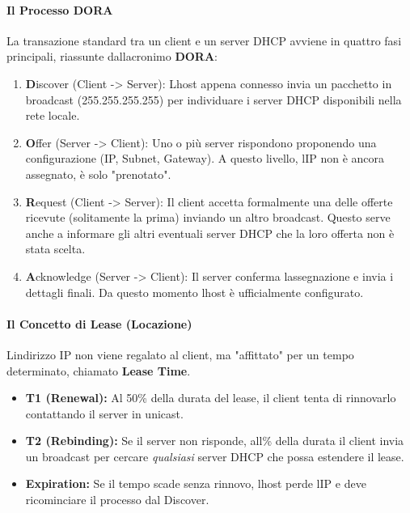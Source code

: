 \documentclass[11pt,a4paper]{article}
\begin{document}
\paragraph{Il Processo DORA}\label{il-processo-dora}

La transazione standard tra un client e un server DHCP avviene in
quattro fasi principali, riassunte dall\textquotesingle acronimo
\textbf{DORA}:

\begin{enumerate}
\def\labelenumi{\arabic{enumi}.}
\item
  \textbf{D}iscover (Client -\textgreater{} Server):
  L\textquotesingle host appena connesso invia un pacchetto in broadcast
  (255.255.255.255) per individuare i server DHCP disponibili nella rete
  locale.
\item
  \textbf{O}ffer (Server -\textgreater{} Client): Uno o più server
  rispondono proponendo una configurazione (IP, Subnet, Gateway). A
  questo livello, l\textquotesingle IP non è ancora assegnato, è solo
  "prenotato".
\item
  \textbf{R}equest (Client -\textgreater{} Server): Il client accetta
  formalmente una delle offerte ricevute (solitamente la prima) inviando
  un altro broadcast. Questo serve anche a informare gli altri eventuali
  server DHCP che la loro offerta non è stata scelta.
\item
  \textbf{A}cknowledge (Server -\textgreater{} Client): Il server
  conferma l\textquotesingle assegnazione e invia i dettagli finali. Da
  questo momento l\textquotesingle host è ufficialmente configurato.
\end{enumerate}

\paragraph{Il Concetto di Lease
(Locazione)}\label{il-concetto-di-lease-locazione}

L\textquotesingle indirizzo IP non viene regalato al client, ma
"affittato" per un tempo determinato, chiamato \textbf{Lease Time}.

\begin{itemize}
\item
  \textbf{T1 (Renewal):} Al 50\% della durata del lease, il client tenta
  di rinnovarlo contattando il server in unicast.
\item
  \textbf{T2 (Rebinding):} Se il server non risponde,
  all\% della durata il client invia un broadcast
  per cercare \emph{qualsiasi} server DHCP che possa estendere il lease.
\item
  \textbf{Expiration:} Se il tempo scade senza rinnovo,
  l\textquotesingle host perde l\textquotesingle IP e deve ricominciare
  il processo dal Discover.
\end{itemize}
\end{document}

